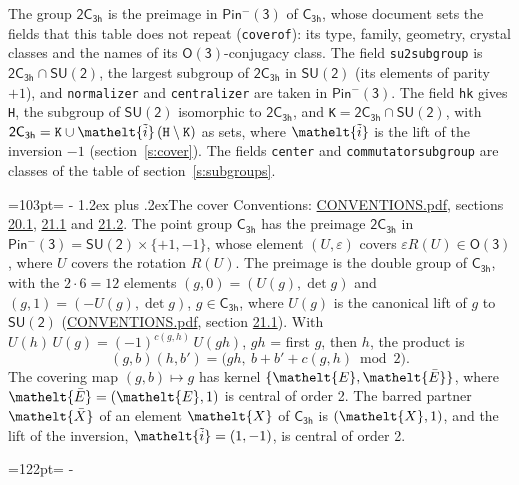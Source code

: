 \documentclass[10pt,a4paper]{article}
\makeatletter
\renewcommand\section{\@startsection{section}{1}{\z@}{-3ex plus -1ex minus -.2ex}%
  {1.2ex plus .2ex}{\normalfont\large\sffamily\bfseries\color{parttitle}}}
\newcommand{\needspace}[1]{\par\penalty-100\begingroup\dimen0=#1\relax\dimen2=\pagegoal
  \advance\dimen2-\pagetotal\ifdim\dimen0>\dimen2\relax\ifdim\dimen2>0pt\vfil\break\fi\fi
  \endgroup}
\numberwithin{equation}{section}
\newcommand{\eltfont}[1]{{\let\sigma\eltsigma\mathelt{#1}}}
\newcommand{\grp}[1]{\mathsf{#1}}
\newcommand{\elt}[1]{\eltfont{#1}}
\newcommand{\dirprod}{\times}
\newcommand{\barred}[1]{\bar{#1}}
\newcommand{\lift}[1]{\tilde{#1}}
\makeatother
\begin{document}
\leavevmode\label{n:element.inversion}\label{n:group.preimage}The group $\grp{2C_{3h}}$ is the preimage in $\grp{Pin^{-}(3)}$ of \href{../../../rotation/data/pdf/C3h.pdf}{$\grp{C_{3h}}$}, whose document sets the fields that this table does not repeat (\texttt{coverof}): its type, family, geometry, crystal classes and the names of its \href{../../../rotation/data/pdf/O3.pdf}{$\grp{O(3)}$}-conjugacy class. The field \texttt{su2subgroup} is $\grp{2C_{3h}} \cap \grp{SU(2)}$, the largest subgroup of $\grp{2C_{3h}}$ in $\grp{SU(2)}$ (its elements of parity $+1$), and \texttt{normalizer} and \texttt{centralizer} are taken in $\grp{Pin^{-}(3)}$. The field \texttt{hk} gives \texttt{H}, the subgroup of $\grp{SU(2)}$ isomorphic to $\grp{2C_{3h}}$, and \texttt{K}${} = \grp{2C_{3h}} \cap \grp{SU(2)}$, with $\grp{2C_{3h}} = \texttt{K} \cup \elt{\lift{i}}\,(\texttt{H} \setminus \texttt{K})$ as sets, where $\elt{\lift{i}}$ is the lift of the inversion $-1$ (section~\ref{s:cover}). The fields \texttt{center} and \texttt{commutatorsubgroup} are classes of the table of section~\ref{s:subgroups}.
\needspace{103pt}
\section{The cover}\label{s:cover}
Conventions: \href{../../CONVENTIONS.pdf}{CONVENTIONS.pdf}, sections \href{../../CONVENTIONS.pdf\#conv.20.1}{20.1}, \href{../../CONVENTIONS.pdf\#conv.21.1}{21.1} and \href{../../CONVENTIONS.pdf\#conv.21.2}{21.2}.
\leavevmode\label{n:group.pin.minus}\label{n:group.su2}\label{n:local.pin.sign}\label{n:matrix.covered}\label{n:matrix.lift.su2}\label{n:index.bar}The point group $\grp{C_{3h}}$ has the preimage $\grp{2C_{3h}}$ in $\grp{Pin^{-}(3)} = \grp{SU(2)} \dirprod \{+1, -1\}$, whose element $(U, \varepsilon)$ covers $\varepsilon R(U) \in \grp{O(3)}$, where $U$ covers the rotation $R(U)$. The preimage is the double group of $\grp{C_{3h}}$, with the $2 \cdot 6 = 12$ elements $(g, 0) = (U(g), \det g)$ and $(g, 1) = (-U(g), \det g)$, $g \in \grp{C_{3h}}$, where $U(g)$ is the canonical lift of $g$ to $\grp{SU(2)}$ (\href{../../CONVENTIONS.pdf}{CONVENTIONS.pdf}, section \href{../../CONVENTIONS.pdf\#conv.21.1}{21.1}). \label{n:function.cocycle}With $U(h)\,U(g) = (-1)^{c(g,h)}\,U(gh)$, $gh$ = first $g$, then $h$, the product is
\begin{equation}\label{e:product}(g, b)(h, b') = \bigl(gh,\ b + b' + c(g, h) \bmod 2\bigr).\end{equation}
\leavevmode\label{n:mark.bar}The covering map $(g, b) \mapsto g$ has kernel $\{\elt{E}, \elt{\barred{E}}\}$, where $\elt{\barred{E}} = (\elt{E}, 1)$ is central of order 2. \label{n:element.named}\label{n:mark.lift}The barred partner $\elt{\barred{X}}$ of an element $\elt{X}$ of $\grp{C_{3h}}$ is $(\elt{X}, 1)$, and the lift of the inversion, $\elt{\lift{i}} = (1, -1)$, is central of order 2.
\needspace{122pt}
\end{document}
